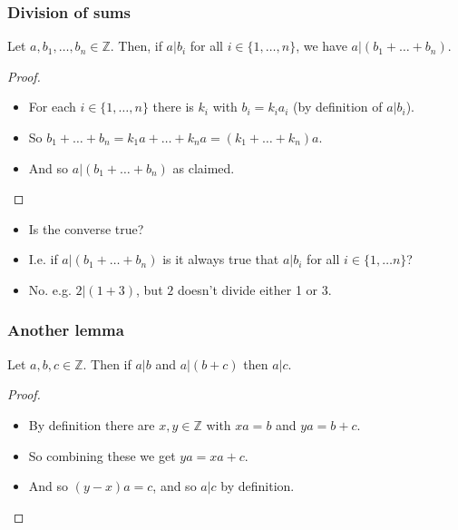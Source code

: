 \documentclass[handout]{beamer}
\newcommand{\bZ}{\mathbb{Z}}
\begin{document}
\begin{frame}
\frametitle{Division of sums}
\begin{lemma}\label{L:plus}
Let $a,b_1,\ldots,b_n\in\bZ$. Then, if $a|b_i$ for all $i\in \{1,\ldots,n\}$, we have $a|(b_1+\ldots +b_n)$.
\end{lemma}
\begin{proof}
\begin{itemize}
\item For each $i\in\{1,\ldots,n\}$ there is $k_i$ with $b_i=k_ia_i$ (by definition of $a|b_i$). 
\item So $b_1+\ldots +b_n = k_1a+\ldots + k_n a = (k_1+\ldots + k_n)a$. 
\item And so $a|(b_1+\ldots+b_n)$ as claimed. 
\end{itemize}
\end{proof}
\begin{itemize}
\item Is the converse true?
\item I.e. if $a|(b_1+\ldots +b_n)$ is it always true that $a|b_i$ for all $i\in\{1,\ldots n\}$?
\item No. e.g. $2|(1+3)$, but $2$ doesn't divide either 1 or 3.
\end{itemize}
\end{frame}

\begin{frame}
\frametitle{Another lemma}
\begin{lemma}\label{L:div1}
Let $a,b,c\in \bZ$. Then if $a|b$ and $a|(b+c)$ then $a|c$.
\end{lemma}
\begin{proof}
\begin{itemize}
\item By definition there are $x,y\in \bZ$ with $xa=b$ and $ya= b+c$. 
\vspace{0.3cm}
\item So combining these we get $ya=xa +c$. 
\vspace{0.3cm}
\item And so $(y-x)a=c$, and so $a|c$ by definition.
\end{itemize}
\end{proof}
\end{frame}
\end{document}
